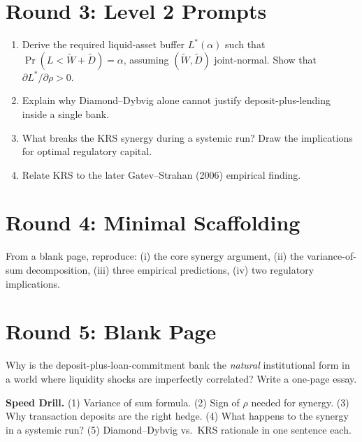 \documentclass[11pt]{article}
\begin{document}
\section*{Round 3: Level 2 Prompts}
\begin{enumerate}
\item Derive the required liquid-asset buffer $L^*(\alpha)$ such that $\Pr(L<\tilde W+\tilde D)=\alpha$, assuming $(\tilde W,\tilde D)$ joint-normal. Show that $\partial L^*/\partial\rho > 0$.
\item Explain why Diamond--Dybvig alone cannot justify deposit-plus-lending inside a single bank.
\item What breaks the KRS synergy during a systemic run? Draw the implications for optimal regulatory capital.
\item Relate KRS to the later Gatev--Strahan (2006) empirical finding.
\end{enumerate}

\section*{Round 4: Minimal Scaffolding}
From a blank page, reproduce: (i) the core synergy argument, (ii) the variance-of-sum decomposition, (iii) three empirical predictions, (iv) two regulatory implications.

\section*{Round 5: Blank Page}
Why is the deposit-plus-loan-commitment bank the \emph{natural} institutional form in a world where liquidity shocks are imperfectly correlated? Write a one-page essay.

\vspace{6pt}
\begin{drillbox}
\textbf{Speed Drill.} (1) Variance of sum formula. (2) Sign of $\rho$ needed for synergy. (3) Why transaction deposits are the right hedge. (4) What happens to the synergy in a systemic run? (5) Diamond--Dybvig vs.\ KRS rationale in one sentence each.
\end{drillbox}
\end{document}
